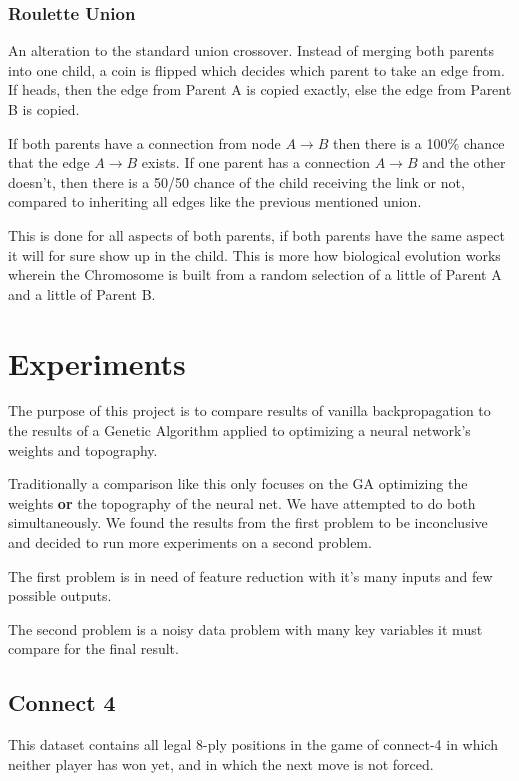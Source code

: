 \documentclass[journal]{IEEEtran}
\begin{document}
    \subsubsection{Roulette Union}
    An alteration to the standard union crossover. Instead of merging both parents into
    one child, a coin is flipped which decides which parent to take an edge from. If heads, then
    the edge from Parent A is copied exactly, else the edge from Parent B is copied.

    If both parents have a connection from node $ A \rightarrow B $ then there is a 100\% chance
    that the edge $A \rightarrow B$ exists. If one parent has a connection $A \rightarrow B$ and
    the other doesn't, then there is a 50/50 chance of the child receiving the link or not,
    compared to inheriting all edges like the previous mentioned union.

    This is done for all aspects of both parents, if both parents have the same aspect it will
    for sure show up in the child. This is more how biological evolution works wherein the
    Chromosome is built from a random selection of a little of Parent A and a little of Parent B.

\section{Experiments}
  The purpose of this project is to compare results of vanilla backpropagation to the results of
  a Genetic Algorithm applied to optimizing a neural network's weights and topography.

  Traditionally a comparison like this only focuses on the GA optimizing the weights \textbf{or}
  the topography of the neural net. We have attempted to do both simultaneously. We found the
  results from the first problem to be inconclusive and decided to run more experiments on a second
  problem.

  The first problem is in need of feature reduction with it's many inputs and few possible outputs.

  The second problem is a noisy data problem with many key variables it must compare for the final
  result.

  \subsection{Connect 4}
   This dataset contains all legal 8-ply positions in the game of
   connect-4 in which neither player has won yet, and in which the next
   move is not forced.
\end{document}
